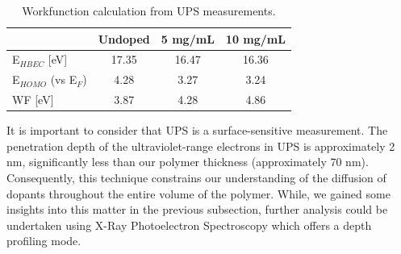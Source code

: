\begin{table}[ht]
\centering
\caption{Workfunction calculation from UPS measurements.}
\begin{tabular}{l|c|c|c}
& Undoped & 5 mg/mL & 10 mg/mL \\\hline
E$_{HBEC}$ [eV] & 17.35 & 16.47 & 16.36\\
E$_{HOMO}$ (vs E$_{F}$) & 4.28 & 3.27 & 3.24\\
WF [eV] & 3.87 & 4.28 & 4.86\\\hline
\end{tabular}
\label{tab:ups}
\end{table}

It is important to consider that UPS is a surface-sensitive measurement. The penetration depth of the ultraviolet-range electrons in UPS is approximately 2 nm, significantly less than our polymer thickness (approximately 70 nm). Consequently, this technique constrains our understanding of the diffusion of dopants throughout the entire volume of the polymer. While, we gained some insights into this matter in the previous subsection, further analysis could be undertaken using X-Ray Photoelectron Spectroscopy which offers a depth profiling mode. %

